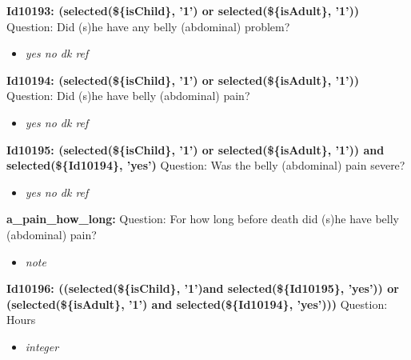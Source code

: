 \documentclass{article}%
\begin{document}
\textbf{Id10193: (selected(\$\{isChild\}, '1') or selected(\$\{isAdult\}, '1'))\newline%
}%
Question: Did (s)he have any belly (abdominal) problem?\newline%
%
\begin{itemize}%
\item%
\textit{yes\newline%
 no\newline%
 dk\newline%
 ref\newline%
}%
\end{itemize}%
\textbf{Id10194: (selected(\$\{isChild\}, '1') or selected(\$\{isAdult\}, '1'))\newline%
}%
Question: Did (s)he have belly (abdominal) pain?\newline%
%
\begin{itemize}%
\item%
\textit{yes\newline%
 no\newline%
 dk\newline%
 ref\newline%
}%
\end{itemize}%
\textbf{Id10195: (selected(\$\{isChild\}, '1') or selected(\$\{isAdult\}, '1')) and selected(\$\{Id10194\}, 'yes')\newline%
}%
Question: Was the belly (abdominal) pain severe?\newline%
%
\begin{itemize}%
\item%
\textit{yes\newline%
 no\newline%
 dk\newline%
 ref\newline%
}%
\end{itemize}%
\textbf{a\_pain\_how\_long: \newline%
}%
Question: For how long before death did (s)he have belly (abdominal) pain?\newline%
%
\begin{itemize}%
\item%
\textit{note\newline%
}%
\end{itemize}%
\textbf{Id10196: ((selected(\$\{isChild\}, '1')and selected(\$\{Id10195\}, 'yes')) or (selected(\$\{isAdult\}, '1') and selected(\$\{Id10194\}, 'yes')))\newline%
}%
Question: Hours\newline%
%
\begin{itemize}%
\item%
\textit{integer\newline%
}%
\end{itemize}%
\end{document}
